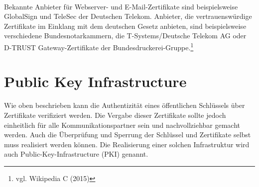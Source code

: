 \\
Bekannte Anbieter für Webserver- und E-Mail-Zertifikate sind beispielsweise GlobalSign und TeleSec der Deutschen Telekom. Anbieter, die vertrauenswürdige Zertifikate im Einklang mit dem deutschen Gesetz anbieten, sind beispielsweise verschiedene Bundesnotarkammern, die T-Systems/Deutsche Telekom AG oder D-TRUST Gateway-Zertifikate der Bundesdruckerei-Gruppe.\footnote{vgl. Wikipedia C (2015)}
\section{Public Key Infrastructure}
\label{sec:PKI}
Wie oben beschrieben kann die Authentizität eines öffentlichen Schlüssels über Zertifikate verifiziert werden. Die Vergabe dieser Zertifikate sollte jedoch einheitlich für alle Kommunikationspartner sein und nachvollziehbar gemacht werden. Auch die Überprüfung und Sperrung der Schlüssel und Zertifikate selbst muss realisiert werden können. Die Realisierung einer solchen Infrastruktur wird auch Public-Key-Infrastructure (PKI) genannt.
